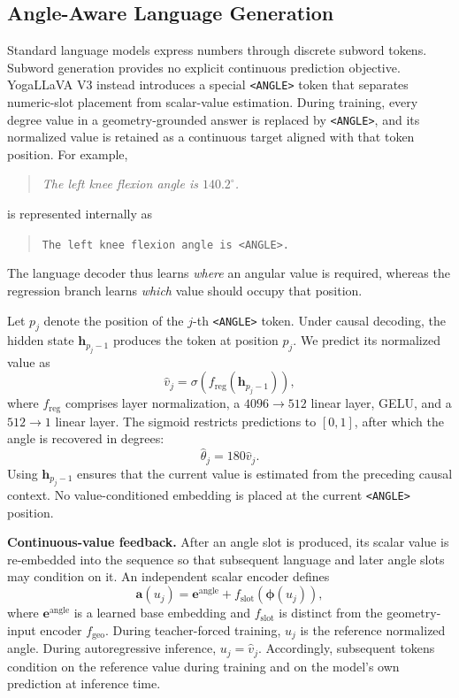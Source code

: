 \subsection{Angle-Aware Language Generation}
\label{sec:angle_generation}

Standard language models express numbers through discrete subword tokens.
Subword generation provides no explicit continuous prediction objective.
YogaLLaVA V3 instead introduces a special \texttt{<ANGLE>} token that separates numeric-slot placement from scalar-value estimation.
During training, every degree value in a geometry-grounded answer is replaced by \texttt{<ANGLE>}, and its normalized value is retained as a continuous target aligned with that token position.
For example,
\begin{quote}
\small
\textit{The left knee flexion angle is $140.2^\circ$.}
\end{quote}
is represented internally as
\begin{quote}
\small
\texttt{The left knee flexion angle is <ANGLE>.}
\end{quote}
The language decoder thus learns \emph{where} an angular value is required, whereas the regression branch learns \emph{which} value should occupy that position.

Let $p_j$ denote the position of the $j$-th \texttt{<ANGLE>} token.
Under causal decoding, the hidden state $\mathbf{h}_{p_j-1}$ produces the token at position $p_j$.
We predict its normalized value as
\begin{equation}
    \widehat{v}_j
    =\sigma\!\left(
        f_{\mathrm{reg}}(\mathbf{h}_{p_j-1})
    \right),
    \label{eq:angle_regression}
\end{equation}
where $f_{\mathrm{reg}}$ comprises layer normalization, a $4096\!\rightarrow\!512$ linear layer, GELU, and a $512\!\rightarrow\!1$ linear layer.
The sigmoid restricts predictions to $[0,1]$, after which the angle is recovered in degrees:
\begin{equation}
    \widehat{\theta}_j=180\widehat{v}_j.
    \label{eq:angle_denormalization}
\end{equation}
Using $\mathbf{h}_{p_j-1}$ ensures that the current value is estimated from the preceding causal context.
No value-conditioned embedding is placed at the current \texttt{<ANGLE>} position.

\noindent\textbf{Continuous-value feedback.}
After an angle slot is produced, its scalar value is re-embedded into the sequence so that subsequent language and later angle slots may condition on it.
An independent scalar encoder defines
\begin{equation}
    \mathbf{a}(u_j)
    =\mathbf{e}^{\mathrm{angle}}
    +f_{\mathrm{slot}}\!\left(\boldsymbol{\phi}(u_j)\right),
    \label{eq:angle_feedback}
\end{equation}
where $\mathbf{e}^{\mathrm{angle}}$ is a learned base embedding and $f_{\mathrm{slot}}$ is distinct from the geometry-input encoder $f_{\mathrm{geo}}$.
During teacher-forced training, $u_j$ is the reference normalized angle.
During autoregressive inference, $u_j=\widehat{v}_j$.
Accordingly, subsequent tokens condition on the reference value during training and on the model's own prediction at inference time.

